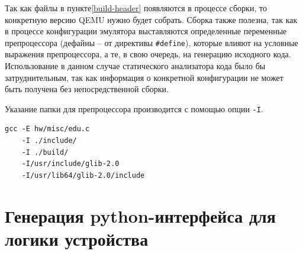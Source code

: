 Так как файлы в пункте\cref{build-header} появляются в процессе сборки, то конкретную версию QEMU нужно будет собрать.
Сборка также полезна, так как в процессе конфигурации эмулятора выставляются определенные переменные
препроцессора (дефайны -- от директивы \texttt{\#define}), которые влияют на условные выражения
препроцессора, а те, в свою очередь, на генерацию исходного кода.
Использование в данном случае статического анализатора кода было бы затруднительным, так как
информация о конкретной конфигурации не может быть получена без непосредственной сборки.

Указание папки для препроцессора производится с помощью опции \texttt{-I}.
\begin{lstlisting}[caption={Пример строки запуска препроцессора для определенного файла устройства},
                   captionpos=b]
gcc -E hw/misc/edu.c
    -I ./include/
    -I ./build/
    -I/usr/include/glib-2.0
    -I/usr/lib64/glib-2.0/include
\end{lstlisting}


\section{Генерация python-интерфейса для логики устройства}\label{sec:ch2/sec2/sub3}

